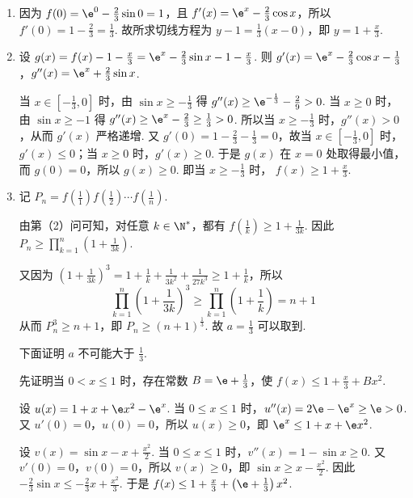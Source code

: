\documentclass[UTF8,a4paper,oneside,11pt]{ctexbook}
\begin{document}
\begin{solution}
\begin{enumerate}
\item 因为 \(f(0)=\e^0-\frac{2}{3}\sin 0=1\)，且 \(f'(x)=\e^x-\frac{2}{3}\cos x\)，所以 \(f'(0)=1-\frac{2}{3}=\frac{1}{3}\). 故所求切线方程为 \(y-1=\frac{1}{3}\left( x-0 \right)\)，即 \(y=1+\frac{x}{3}\).

\item 设 \(g(x)=f(x)-1-\frac{x}{3}=\e^x-\frac{2}{3}\sin x-1-\frac{x}{3}\). 则 \(g'(x)=\e^x-\frac{2}{3}\cos x-\frac{1}{3}\)，\(g''(x)=\e^x+\frac{2}{3}\sin x\).

当 \(x\in \left[ -\frac{1}{3},0 \right]\) 时，由 \(\sin x\ge -\frac{1}{3}\) 得 \(g''(x)\ge \e^{-\frac{1}{3}}-\frac{2}{9}>0\). 当 \(x\ge 0\) 时，由 \(\sin x\ge -1\) 得 \(g''(x)\ge \e^x-\frac{2}{3}\ge \frac{1}{3}>0\). 所以当 \(x\ge -\frac{1}{3}\) 时，\(g''(x)>0\)，从而 \(g'(x)\) 严格递增.
又 \(g'(0)=1-\frac{2}{3}-\frac{1}{3}=0\)，故当 \(x\in \left[ -\frac{1}{3},0 \right]\) 时，\(g'(x)\le 0\)；当 \(x\ge 0\) 时，\(g'(x)\ge 0\). 于是 \(g(x)\) 在 \(x=0\) 处取得最小值，而 \(g(0)=0\)，所以 \(g(x)\ge 0\). 即当 \(x\ge -\frac{1}{3}\) 时，
\(f(x)\ge 1+\frac{x}{3}\).

\item 记 \(P_n=f\left( \frac{1}{1} \right)f\left( \frac{1}{2} \right)\cdots f\left( \frac{1}{n} \right)\).

由第（2）问可知，对任意 \(k\in \N^*\)，都有 \(f\left( \frac{1}{k} \right)\ge 1+\frac{1}{3k}\). 因此 \(P_n\ge \prod_{k=1}^{n}\left( 1+\frac{1}{3k} \right)\).

又因为 \(\left( 1+\frac{1}{3k} \right)^3=1+\frac{1}{k}+\frac{1}{3k^2}+\frac{1}{27k^3}\ge 1+\frac{1}{k}\)，所以
\[
\prod_{k=1}^{n}\left( 1+\frac{1}{3k} \right)^3\ge \prod_{k=1}^{n}\left( 1+\frac{1}{k} \right)=n+1
\]
从而 \(P_n^3\ge n+1\)，即 \(P_n\ge \left( n+1 \right)^{\frac{1}{3}}\). 故 \(a=\frac{1}{3}\) 可以取到.

下面证明 \(a\) 不可能大于 \(\frac{1}{3}\).

先证明当 \(0<x\le 1\) 时，存在常数 \(B=\e+\frac{1}{3}\)，使 \(f(x)\le 1+\frac{x}{3}+Bx^2\).

设 \(u(x)=1+x+\e x^2-\e^x\). 当 \(0\le x\le 1\) 时，\(u''(x)=2\e-\e^x\ge \e>0\). 又 \(u'(0)=0\)，\(u(0)=0\)，所以 \(u(x)\ge 0\)，即 \(\e^x\le 1+x+\e x^2\).

设 \(v(x)=\sin x-x+\frac{x^2}{2}\). 当 \(0\le x\le 1\) 时，\(v''(x)=1-\sin x\ge 0\). 又 \(v'(0)=0\)，\(v(0)=0\)，所以 \(v(x)\ge 0\)，即 \(\sin x\ge x-\frac{x^2}{2}\). 因此 \(-\frac{2}{3}\sin x\le -\frac{2}{3}x+\frac{x^2}{3}\). 于是 \(f(x)\le 1+\frac{x}{3}+\left( \e+\frac{1}{3} \right)x^2\).


\end{enumerate}
\end{solution}
\end{document}
